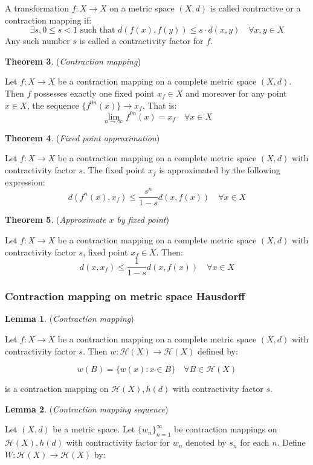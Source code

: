 A transformation \(f: X \rightarrow X\) on a metric space $(X, d)$ is called contractive or a contraction mapping if:
\[
\exists s, 0 \leq s < 1 \text{ such that } d(f(x), f(y)) \leq s \cdot d(x, y) \quad \forall x, y \in X
\]
Any such number \(s\) is called a contractivity factor for \(f\).

\textbf{Theorem 3}. (\textit{Contraction mapping})

Let \(f: X \rightarrow X\) be a contraction mapping on a complete metric space $(X, d)$. Then \(f\) possesses exactly one fixed point \(x_f \in X\) and moreover for any point \(x \in X\), the sequence \(\{f^{0n}(x)\} \rightarrow x_f\). That is:
\[
\lim_{n \to \infty} f^{0n}(x) = x_f \quad \forall x \in X
\]

\textbf{Theorem 4}. (\textit{Fixed point approximation})

Let \(f: X \rightarrow X\) be a contraction mapping on a complete metric space $(X, d)$ with contractivity factor \(s\). The fixed point \(x_f\) is approximated by the following expression:
\[
d(f^n(x), x_f) \leq \frac{s^n}{1 - s} d(x, f(x)) \quad \forall x \in X
\]

\textbf{Theorem 5}. (\textit{Approximate \(x\) by fixed point})

Let \(f: X \rightarrow X\) be a contraction mapping on a complete metric space $(X, d)$ with contractivity factor \(s\), fixed point \(x_f \in X\). Then:
\[
d(x, x_f) \leq \frac{1}{1 - s} d(x, f(x)) \quad \forall x \in X
\]

\pagebreak
\subsubsection{Contraction mapping on metric space Hausdorff}
\textbf{Lemma 1}. (\textit{Contraction mapping})

Let \(f: X \rightarrow X\) be a contraction mapping on a complete metric space $(X, d)$ with contractivity factor \(s\). Then \(w: \mathcal{H}(X) \rightarrow \mathcal{H}(X)\) defined by:

\[
w(B) = \{w(x) : x \in B\} \quad \forall B \in \mathcal{H}(X)
\]

is a contraction mapping on \(\mathcal{H}(X), h(d)\) with contractivity factor \(s\).

\textbf{Lemma 2}. (\textit{Contraction mapping sequence})

Let $(X, d)$ be a metric space. Let \(\{w_n\}_{n=1}^\infty\) be contraction mappings on \(\mathcal{H}(X), h(d)\) with contractivity factor for \(w_n\) denoted by \(s_n\) for each \(n\). Define \(W: \mathcal{H}(X) \rightarrow \mathcal{H}(X)\) by:

